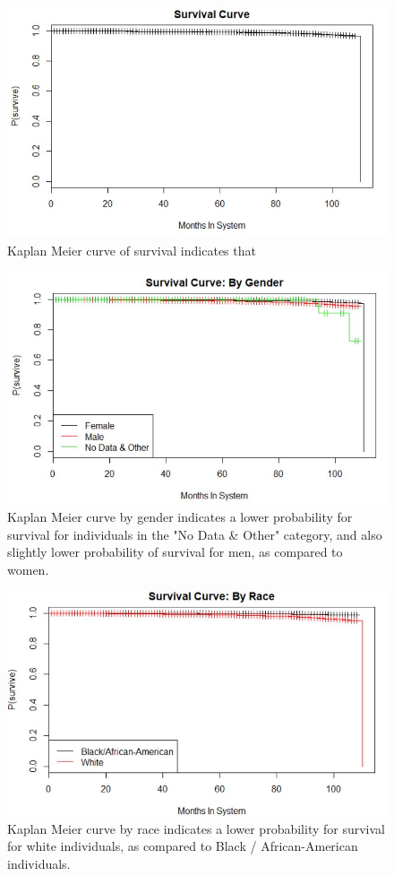 \documentclass[twoside,10.5pt]{article}
\begin{document}
\begin{figure}[htp]
\centering
\includegraphics[width=12cm]{images/kaplan_meier.JPG}
\caption{Kaplan Meier curve of survival indicates that }
\label{fig:km_original}
\end{figure}

\begin{figure}[htp]
\centering
\includegraphics[width=12cm]{images/kaplan_meier_gender.JPG}
\caption{Kaplan Meier curve by gender indicates a lower probability for survival for individuals in the "No Data & Other" category, and also slightly lower probability of survival for men, as compared to women.}
\label{fig:km_gender}
\end{figure}

\begin{figure}[htp]
\centering
\includegraphics[width=12cm]{images/kaplan_meier_race.JPG}
\caption{Kaplan Meier curve by race indicates a lower probability for survival for white individuals, as compared to Black / African-American individuals. }
\label{fig:km_race}
\end{figure}
\end{document}
